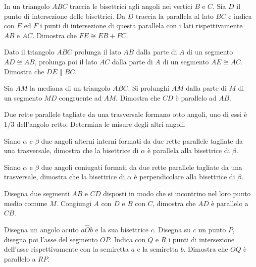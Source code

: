 \begin{multicols}{2}
\begin{esercizio}
\label{ese:3.36}
In un triangolo $ABC$ traccia le bisettrici agli angoli nei vertici $B$ e $C$. Sia $D$ il punto di intersezione delle bisettrici. Da $D$ traccia la parallela al lato $BC$ e indica con $E$ ed $F$ i punti di intersezione di questa parallela con i lati rispettivamente $AB$ e $AC$. Dimostra che $FE\cong EB+FC$.
\end{esercizio}

\begin{esercizio}
\label{ese:3.37}
Dato il triangolo $ABC$ prolunga il lato $AB$ dalla parte di $A$ di un segmento $AD\cong AB$, prolunga poi il lato $AC$ dalla parte di $A$ di un segmento $AE\cong AC$. Dimostra che $DE\parallel BC$.
\end{esercizio}

\begin{esercizio}
\label{ese:3.38}
Sia $AM$ la mediana di un triangolo $ABC$. Si prolunghi $AM$ dalla parte di $M$ di un segmento $MD$ congruente ad $AM$. Dimostra che $CD$ è parallelo ad $AB$.
\end{esercizio}

\begin{esercizio}
\label{ese:3.39}
Due rette parallele tagliate da una trasversale formano otto angoli, uno di essi è $1/3$ dell'angolo retto. Determina le misure degli altri angoli.
\end{esercizio}

\begin{esercizio}
\label{ese:3.40}
Siano $\alpha$ e $\beta$ due angoli alterni interni formati da due rette parallele tagliate da una trasversale, dimostra che la bisettrice di $\alpha$ è parallela alla bisettrice di $\beta$.
\end{esercizio}

\begin{esercizio}
\label{ese:3.41}
Siano $\alpha$ e $\beta$ due angoli coniugati formati da due rette parallele tagliate da una trasversale, dimostra che la bisettrice di $\alpha$ è perpendicolare alla bisettrice di $\beta$.
\end{esercizio}

\begin{esercizio}
\label{ese:3.42}
Disegna due segmenti $AB$ e $CD$ disposti in modo che si incontrino nel loro punto medio comune $M$. Congiungi $A$ con $D$ e $B$ con $C$, dimostra che $AD$ è parallelo a $CB$.
\end{esercizio}

\begin{esercizio}
\label{ese:3.43}
Disegna un angolo acuto $a\widehat{O}b$ e la sua bisettrice $c$. Disegna su $c$ un punto $P$, disegna poi l'asse del segmento $OP$. Indica con $Q$ e $R$ i punti di intersezione dell'asse rispettivamente con la semiretta $a$ e la semiretta $b$. Dimostra che $OQ$ è parallelo a $RP$.
\end{esercizio}


\end{multicols}
